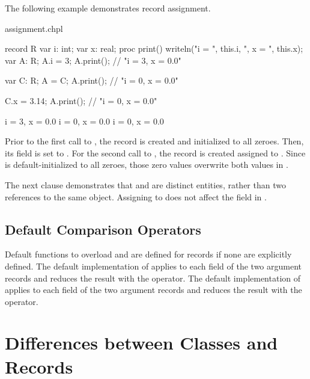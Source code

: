 The following example demonstrates record assignment.
\begin{chapelexample}{assignment.chpl}
\begin{chapel}
record R {
  var i: int;
  var x: real;
  proc print() { writeln("i = ", this.i, ", x = ", this.x); }
}
var A: R;
A.i = 3;
A.print();	// "i = 3, x = 0.0"

var C: R;
A = C;
A.print();	// "i = 0, x = 0.0"

C.x = 3.14;
A.print();	// "i = 0, x = 0.0"
\end{chapel}
\begin{chapeloutput}
i = 3, x = 0.0
i = 0, x = 0.0
i = 0, x = 0.0
\end{chapeloutput}
Prior to the first call to , the record  is created and
initialized to all zeroes.  Then, its  field is set to .
For the second call to , the record  is created assigned
to .  Since  is default-initialized to all zeroes, those zero
values overwrite both values in .

The next clause demonstrates that  and  are distinct entities,
rather than two references to the same object.  Assigning 
to  does not affect the  field in .
\end{chapelexample}

\subsection{Default Comparison Operators}
\label{Record_Comparison_Operators}
Default functions to overload \chpl{==} and \chpl{\!=} are defined for
records if none are explicitly defined.
The default implementation of \chpl{==} applies \chpl{==} to each
field of the two argument records and reduces the result with
the \chpl{&&} operator.  The default implementation of \chpl{\!=}
applies \chpl{\!=} to each field of the two argument records and
reduces the result with the \chpl{||} operator.

\section{Differences between Classes and Records}
\label{Class_and_Record_Differences}


